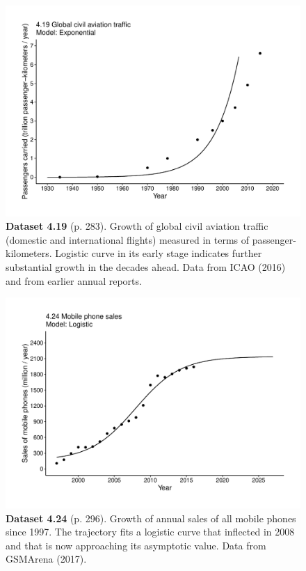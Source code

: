 \documentclass[aps,rmp,preprint,superscriptaddress,10pt,onecolumn]{article}
\begin{document}
\clearpage
\begin{figure}[h]
\includegraphics[width=\textwidth]{output/figs-ggplot/4.19.pdf}
\caption*{\textbf{Dataset 4.19} (p. 283). Growth of global civil aviation traffic (domestic and international flights) measured in terms of passenger-kilometers. Logistic curve in its early stage indicates further substantial growth in the decades ahead. Data from ICAO (2016) and from earlier annual reports. }
\end{figure}
	
\clearpage
\begin{figure}[h]
\includegraphics[width=\textwidth]{output/figs-ggplot/4.24.pdf}
\caption*{\textbf{Dataset 4.24} (p. 296). Growth of annual sales of all mobile phones since 1997. The trajectory fits a logistic curve that inflected in 2008 and that is now approaching its asymptotic value. Data from GSMArena (2017).}
\end{figure}
	
\end{document}
